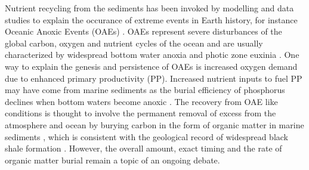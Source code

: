 \documentclass[gmd, manuscript]{copernicus}
\begin{document}

Nutrient recycling from the sediments has been invoked by modelling and data studies to explain the occurance of extreme events in Earth history, for instance Oceanic Anoxic Events (OAEs) 
\citep[e.g.][]{mort_phosphorus_2007, tsandev_modeling_2009}. OAEs represent severe disturbances of the global carbon, oxygen and nutrient cycles of the ocean and are usually characterized 
by widespread bottom water anoxia and photic zone euxinia \citep{jenkyns_geochemistry_2010}. 
One way to explain the genesis and persistence of OAEs is increased oxygen demand due to enhanced primary productivity (PP). Increased nutrient inputs to fuel PP may have come from marine sediments as the 
burial efficiency of phosphorus declines when bottom waters become anoxic \citep{ingall_evidence_1994, van_cappellen_benthic_1994}. 
The recovery from OAE like conditions is thought to involve the permanent removal of excess  from the atmosphere and ocean by burying carbon in the form of organic matter in marine sediments 
\citep[e.g.][]{arthur_geochemical_1988, jarvis_black_2011}, which is consistent with the geological record of widespread black shale formation \citep{stein_accumulation_1986}. 
However, the overall amount, exact timing and the rate of organic matter burial remain a topic of an ongoing debate. 

\end{document}

